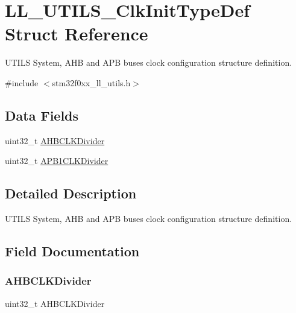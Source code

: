 \hypertarget{struct_l_l___u_t_i_l_s___clk_init_type_def}{}\section{L\+L\+\_\+\+U\+T\+I\+L\+S\+\_\+\+Clk\+Init\+Type\+Def Struct Reference}
\label{struct_l_l___u_t_i_l_s___clk_init_type_def}


U\+T\+I\+LS System, A\+HB and A\+PB buses clock configuration structure definition.  




{\ttfamily \#include $<$stm32f0xx\+\_\+ll\+\_\+utils.\+h$>$}

\subsection*{Data Fields}
\begin{DoxyCompactItemize}
\item 
uint32\+\_\+t \hyperlink{struct_l_l___u_t_i_l_s___clk_init_type_def_a082c91ea9f270509aca7ae6ec42c2a54}{A\+H\+B\+C\+L\+K\+Divider}
\item 
uint32\+\_\+t \hyperlink{struct_l_l___u_t_i_l_s___clk_init_type_def_a994aca51c40decfc340e045da1a6ca19}{A\+P\+B1\+C\+L\+K\+Divider}
\end{DoxyCompactItemize}


\subsection{Detailed Description}
U\+T\+I\+LS System, A\+HB and A\+PB buses clock configuration structure definition. 

\subsection{Field Documentation}
\mbox{\label{struct_l_l___u_t_i_l_s___clk_init_type_def_a082c91ea9f270509aca7ae6ec42c2a54}} 
\subsubsection{\texorpdfstring{A\+H\+B\+C\+L\+K\+Divider}{AHBCLKDivider}}
{\footnotesize\ttfamily uint32\+\_\+t A\+H\+B\+C\+L\+K\+Divider}

